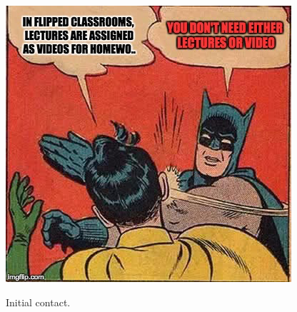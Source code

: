 \documentclass{beamer}
\begin{document}
    \begin{frame}
		\begin{center}
			\includegraphics[width=.6\textwidth]{./static/time_for_this_again.png}
		\end{center}
	\end{frame}

    \begin{frame}
        \Huge
        \begin{center}
			Initial contact.
        \end{center}
    \end{frame}
\end{document}
